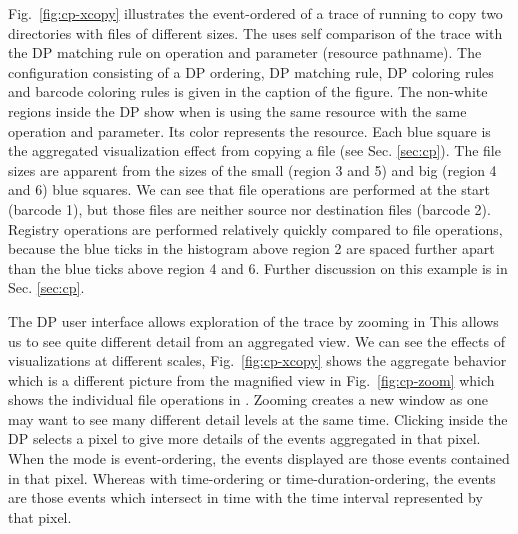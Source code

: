Fig.~\ref{fig:cp-xcopy} illustrates the event-ordered \VDP{}
of a trace of running
\xcopy{} to copy two directories with files of different sizes.
The \VDP{} uses self comparison of the \xcopy{} trace with
the DP matching rule on operation and parameter (resource pathname).
The \VDP{} configuration consisting of a DP ordering, DP matching rule,
DP coloring rules and barcode coloring rules
is given in the caption of the figure.
The non-white regions inside the DP show when \xcopy{} is using the
same resource with the same operation and parameter.
Its color represents the resource.
Each blue square is the aggregated visualization effect from
copying a file (see Sec. \ref{sec:cp}).
The file sizes are apparent from the sizes of the small (region 3 and 5)
and big (region 4 and 6) blue squares.
We can see that file operations are performed at the start (barcode 1),
but those files are neither source nor destination files (barcode 2).
Registry operations are performed relatively
quickly compared to file operations,
because the blue ticks in the histogram above region 2 are spaced further apart
than the blue ticks above region 4 and 6.
Further discussion on this example is in Sec. \ref{sec:cp}.

The DP user interface allows exploration of the trace by zooming in
This allows us to see quite different detail from an aggregated view.
We can see the effects of visualizations at different scales,
Fig.~\ref{fig:cp-xcopy} shows the aggregate behavior which
is a different picture from the magnified view in
Fig.~\ref{fig:cp-zoom} which shows the individual file operations in \xcopy{}.
Zooming creates a new window as one may want to see many different
detail levels at the same time. Clicking inside the DP selects
a pixel to give more details of the events aggregated in that pixel. When
the mode is event-ordering, the events displayed are those events contained
in that pixel. Whereas with time-ordering or time-duration-ordering,
the events are those events which intersect in time with the time interval
represented by that pixel. 

% 
% 

